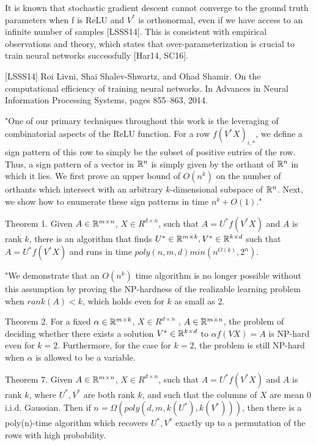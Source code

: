 \documentclass[english]{article}
\begin{document}
It is known that stochastic gradient descent cannot converge to the ground truth parameters when f is ReLU and $V^*$ is orthonormal, even if we have access to an infinite number of samples [LSSS14]. This is consistent with empirical observations and theory, which states that
over-parameterization is crucial to train neural networks successfully [Har14, SC16].

[LSSS14] Roi Livni, Shai Shalev-Shwartz, and Ohad Shamir. On the computational efficiency
of training neural networks. In Advances in Neural Information Processing Systems,
pages 855–863, 2014.

"One of our
primary techniques throughout this work is the leveraging of combinatorial aspects of the ReLU
function. For a row $f(V^* X)_{i,*}$, we define a sign pattern of this row to simply be the subset of
positive entries of the row. Thus, a sign pattern of a vector in $\mathbb{R}^n$ is simply given by the orthant
of $\mathbb{R}^n$ in which it lies. We first prove an upper bound of $O(n^k)$ on the number of orthants which
intersect with an arbitrary $k$-dimensional subspace of $\mathbb{R}^n$. Next, we show how to enumerate these
sign patterns in time $n^k+O(1)$."

Theorem 1. Given $A \in \mathbb{R}^{m\times n}$, $X \in R^{d\times n}$, such that $A = U^* f(V^* X)$ and $A$ is rank $k$, there
is an algorithm that finds $U^* \in \mathbb{R}^{m\times k} ,V^* \in \mathbb{R}^{k\times d}$ such that $A = U^* f(V^* X)$ and runs in time $
poly(n,m,d) min(n^{O(k)} ,2^n)$.

"We demonstrate that an $O(n^k)$ time algorithm is no longer
possible without this assumption by proving the NP-hardness of the realizable learning problem when $rank(A) < k$, which holds even for $k$ as small as 2. 


Theorem 2. For a fixed $\alpha \in \mathbb{R}^{m\times k}$, $X \in R^{d\times n}$ , $A \in \mathbb{R}^{m\times n}$, the problem of deciding whether there
exists a solution $V^* \in \mathbb{R}^{k\times d}$ to $\alpha f(VX) = A$ is NP-hard even for $k = 2$. Furthermore, for the case
for $k = 2$, the problem is still NP-hard when $\alpha$ is allowed to be a variable.

Theorem 7. Given $A \in \mathbb{R}^{m\times n}$, $X \in R^{d\times n}$, such that $A = U^* f(V^* X)$ and $A$ is rank $k$, where $U^*,V^*$ are both rank $k$, and such
that the columns of $X$ are mean 0 i.i.d. Gaussian. Then if $n = \Omega(poly(d,m,k(U^*),k(V^*)))$,
then there is a poly(n)-time algorithm which recovers $U^*,V^*$ exactly up to a permutation of the
rows with high probability.
\end{document}
